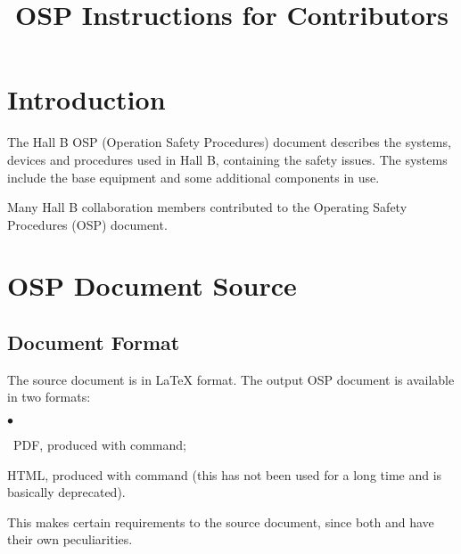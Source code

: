 \documentclass[12pt,letterpaper]{article}
\begin{document}
\color{\Mcol}
\pagestyle{headings}

\hypersetup{pageanchor=false}
\begin{titlepage}
\title{{\bf OSP Instructions for Contributors}}

\author{} 
\setcounter{tocdepth}{3}
\end{titlepage} 
\maketitle 
\hypersetup{pageanchor=true}
 
\tableofcontents



\section{Introduction}
\label{sec:intro}

  The Hall B\cite{Hallbwww} OSP (Operation Safety Procedures) document describes  
  the systems, devices and procedures used in Hall B, containing
  the safety issues. The systems include the base equipment and some additional components in use.

  Many Hall B collaboration members contributed to the Operating Safety 
  Procedures (OSP) document. 

\section{OSP Document Source}
\label{sec:document}
   
\subsection{Document Format}
\label{sec:format}   

  The source document is in \LaTeX{} format.
  The output OSP document is available in two formats: 
  \begin{list}{$\bullet$}{\setlength{\itemsep}{-0.15cm}}
    \item ~PDF, produced with  command; 
    \item HTML, produced with  command (this has not been used for a long
          time and is basically deprecated). 
  \end{list}
  This makes certain requirements to the source document,
  since both  and  have their own
  peculiarities.
\end{document}
